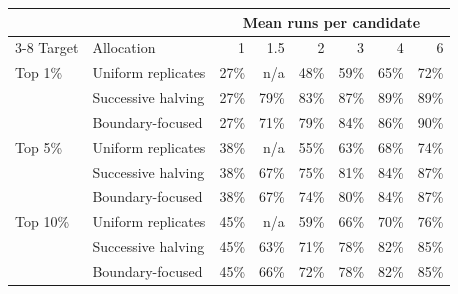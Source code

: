 \begin{tabular}{llrrrrrr}
\toprule
 & & \multicolumn{6}{c}{Mean runs per candidate} \\
\cmidrule(lr){3-8}
Target & Allocation & 1 & 1.5 & 2 & 3 & 4 & 6 \\
\midrule
Top 1\% & Uniform replicates & 27\% & n/a & 48\% & 59\% & 65\% & 72\% \\
 & Successive halving & 27\% & 79\% & 83\% & 87\% & 89\% & 89\% \\
 & Boundary-focused & 27\% & 71\% & 79\% & 84\% & 86\% & 90\% \\
\addlinespace
Top 5\% & Uniform replicates & 38\% & n/a & 55\% & 63\% & 68\% & 74\% \\
 & Successive halving & 38\% & 67\% & 75\% & 81\% & 84\% & 87\% \\
 & Boundary-focused & 38\% & 67\% & 74\% & 80\% & 84\% & 87\% \\
\addlinespace
Top 10\% & Uniform replicates & 45\% & n/a & 59\% & 66\% & 70\% & 76\% \\
 & Successive halving & 45\% & 63\% & 71\% & 78\% & 82\% & 85\% \\
 & Boundary-focused & 45\% & 66\% & 72\% & 78\% & 82\% & 85\% \\
\bottomrule
\end{tabular}

